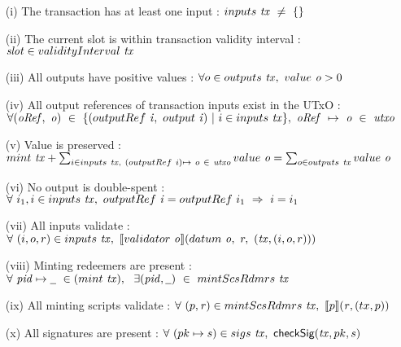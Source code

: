 \begin{itemize}
  \item[(i)] The transaction has at least one input : $\inputs~\var{tx}~\neq~\{\}$
  \item[(ii)] The current slot is within transaction validity interval : $\var{slot} \in \fun{validityInterval}~\var{tx}$
  \item[(iii)] All outputs have positive values : $\forall o \in \outputs~\var{tx},~\val~\var{o} > 0$
  \item[(iv)] All output references of transaction inputs exist in the UTxO : \\
  $\forall (\var{oRef},~\var{o})~\in~\{(\outputref~\var{i},~\fun{output}~\var{i}) ~|~ i \in \inputs~\var{tx} \},
  ~\var{oRef}~ \mapsto~\var{o}~ \in ~\var{utxo} $
  \item[(v)] Value is preserved : $\mint~\var{tx} + \sum_{i \in \inputs~\var{tx},~(\outputref~i)\mapsto~o~\in~\var{utxo}} \val~\var{o} = \sum_{o \in \outputs~\var{tx}} \val~\var{o}$
  \item[(vi)] No output is double-spent : $\forall~i_1, i \in \inputs~\var{tx},~\outputref~\var{i} = \outputref~i_1 ~\Rightarrow~ i = i_1$
  \item[(vii)] All inputs validate : $\forall~ (i, o, r) \in \inputs~\var{tx},~ \applyScript{\validator~\var{o}}(\datum~\var{o},~r,~ (\var{tx}, (i, o, r))) $
  \item[(viii)] Minting redeemers are present : $\forall ~\var{pid}\mapsto \wcard~ \in (\mint~\var{tx}), ~~\exists
  (\var{pid},\wcard) ~\in~ \mintScsRdmrs~\var{tx}$
  \item[(ix)] All minting scripts validate : $\forall~ (p, \var{r}) \in \mintScsRdmrs~\var{tx},~ \applyMPScript{p}(\var{r}, (tx, p)) $
  \item[(x)] All signatures are present : $\forall~ (pk \mapsto s) \in \sigs~\var{tx},~ \checkSig(\var{tx}, pk, s) $
\end{itemize}

